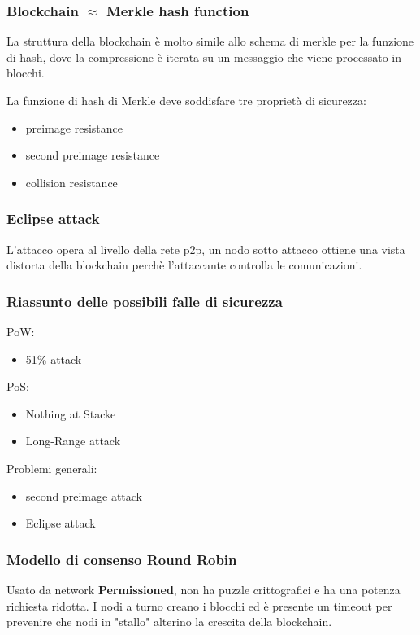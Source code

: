\subsubsection{Blockchain $\approx$ Merkle hash function}
La struttura della blockchain è molto simile allo schema di merkle per la funzione di hash, dove la compressione è iterata su un messaggio che viene processato in blocchi.

La funzione di hash di Merkle deve soddisfare tre proprietà di sicurezza:
\begin{itemize}
    \item preimage resistance
    \item second preimage resistance
    \item collision resistance
\end{itemize}

\subsubsection{Eclipse attack}
L'attacco opera al livello della rete p2p, un nodo sotto attacco ottiene una vista distorta della blockchain perchè l'attaccante controlla le comunicazioni.

\subsubsection{Riassunto delle possibili falle di sicurezza}
PoW:
\begin{itemize}
    \item 51$\%$ attack
\end{itemize}

PoS:
\begin{itemize}
    \item Nothing at Stacke
    \item Long-Range attack
\end{itemize}

Problemi generali:
\begin{itemize}
    \item second preimage attack
    \item Eclipse attack
\end{itemize}

\subsubsection{Modello di consenso Round Robin}
Usato da network \textbf{Permissioned}, non ha puzzle crittografici e ha una potenza richiesta ridotta.
I nodi a turno creano i blocchi ed è presente un timeout per prevenire che nodi in "stallo" alterino la crescita della blockchain.

